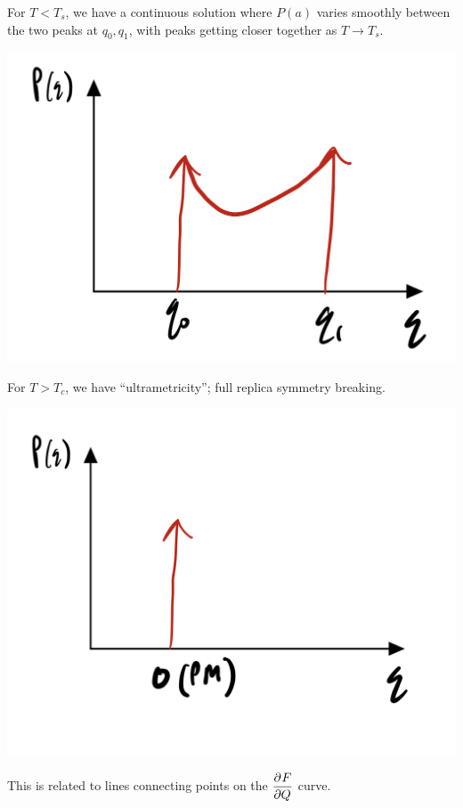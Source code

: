 For $T < T_s$, we have a continuous solution where $P(a)$ varies smoothly between the two peaks at $q_0, q_1$, with peaks getting closer together as $T \to T_s$.

\begin{center}
    \includegraphics[scale=0.35]{Lectures/Figures/lec15-TleqTs.png}
\end{center}

For $T > T_c$, we have ``ultrametricity''; full replica symmetry breaking.

\begin{center}
    \includegraphics[scale=0.35]{Lectures/Figures/lec15-TgeqTs.png}
\end{center}

This is related to lines connecting points on the $\dpd{F}{Q}$ curve.

